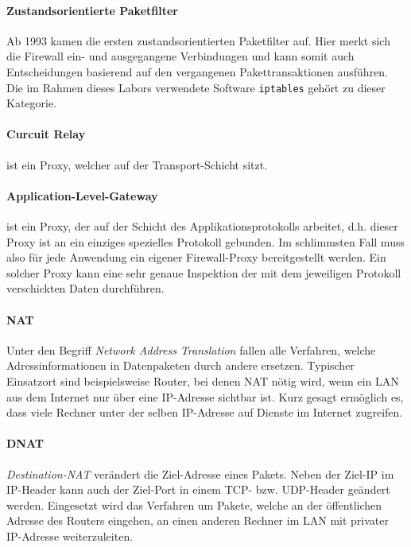 \paragraph{Zustandsorientierte Paketfilter} Ab 1993 kamen die ersten
zustandsorientierten Paketfilter auf. Hier merkt sich die Firewall
ein- und ausgegangene Verbindungen und kann somit auch Entscheidungen
basierend auf den vergangenen Pakettransaktionen ausführen.
Die im Rahmen dieses Labors verwendete Software {\tt iptables} gehört zu dieser
Kategorie.\cite{iptables}

\paragraph{Curcuit Relay} ist ein Proxy, welcher auf der Transport-Schicht
sitzt.

\paragraph{Application-Level-Gateway} ist ein Proxy, der auf der Schicht
des Applikationsprotokolls arbeitet, d.h. dieser Proxy ist an ein einziges
spezielles Protokoll gebunden. Im schlimmsten Fall muss also für jede
Anwendung ein eigener Firewall-Proxy bereitgestellt werden.
Ein solcher Proxy kann eine sehr genaue Inspektion der mit dem jeweiligen
Protokoll verschickten Daten durchführen.\cite{iptables}

\paragraph{NAT}
Unter den Begriff \emph{Network Address Translation} fallen alle Verfahren,
welche Adressinformationen in Datenpaketen durch andere ersetzen.
Typischer Einsatzort sind beispielsweise Router, bei denen NAT nötig wird,
wenn ein LAN aus dem Internet nur über eine IP-Adresse sichtbar ist.
Kurz gesagt ermöglich es, dass viele Rechner unter der selben IP-Adresse auf Dienste
im Internet zugreifen.\cite{iptables}

\paragraph{DNAT}
\emph{Destination-NAT} verändert die Ziel-Adresse eines Pakets.
Neben der Ziel-IP im IP-Header kann auch der Ziel-Port in einem
TCP- bzw. UDP-Header geändert werden.
Eingesetzt wird das Verfahren um Pakete, welche an der öf\-fent\-lichen Adresse
des Routers eingehen, an einen anderen Rechner im LAN mit privater IP-Adresse
weiterzuleiten.

